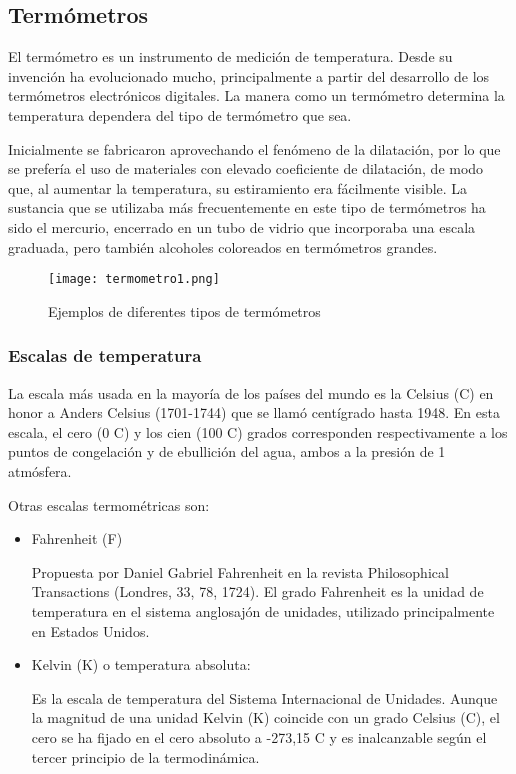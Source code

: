 \subsection{Termómetros}

\par 
El termómetro es un instrumento de medición de temperatura. Desde su invención ha evolucionado mucho, principalmente a partir del desarrollo de los termómetros electrónicos digitales. La manera como un termómetro determina la temperatura dependera del tipo de termómetro que sea. 

\par \noindent
Inicialmente se fabricaron aprovechando el fenómeno de la dilatación, por lo que se prefería el uso de materiales con elevado coeficiente de dilatación, de modo que, al aumentar la temperatura, su estiramiento era fácilmente visible. La sustancia que se utilizaba más frecuentemente en este tipo de termómetros ha sido el mercurio, encerrado en un tubo de vidrio que incorporaba una escala graduada, pero también alcoholes coloreados en termómetros grandes.

\begin{figure}[H]
	\centering
	\texttt{[image: termometro1.png]}
	\caption{Ejemplos de diferentes tipos de termómetros}
\end{figure}

\subsubsection{Escalas de temperatura}

\par 
La escala más usada en la mayoría de los países del mundo es la Celsius (\textdegree{}C) en honor a Anders Celsius (1701-1744) que se llamó centígrado hasta 1948. En esta escala, el cero (0 \textdegree{}C) y los cien (100 \textdegree{}C) grados corresponden respectivamente a los puntos de congelación y de ebullición del agua, ambos a la presión de 1 atmósfera.

\par \noindent 
Otras escalas termométricas son:

\begin{itemize}
	
\item Fahrenheit (\textdegree{}F) 

Propuesta por Daniel Gabriel Fahrenheit en la revista Philosophical Transactions (Londres, 33, 78, 1724). El grado Fahrenheit es la unidad de temperatura en el sistema anglosajón de unidades, utilizado principalmente en Estados Unidos.

\item Kelvin (K) o temperatura absoluta: 

Es la escala de temperatura del Sistema Internacional de Unidades. Aunque la magnitud de una unidad Kelvin (K) coincide con un grado Celsius (\textdegree{}C), el cero se ha fijado en el cero absoluto a -273,15 \textdegree{}C y es inalcanzable según el tercer principio de la termodinámica.
\end{itemize}

